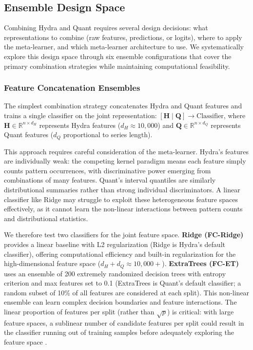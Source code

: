 \documentclass[pdflatex,sn-basic]{sn-jnl}           %
\theoremstyle{thmstyleone}%
\theoremstyle{thmstyletwo}%
\theoremstyle{thmstylethree}%
\begin{document}
\subsection{Ensemble Design Space}\label{subsec:design_space}

Combining Hydra and Quant requires several design decisions: what representations to combine (raw features, predictions, or logits), where to apply the meta-learner, and which meta-learner architecture to use. We systematically explore this design space through six ensemble configurations that cover the primary combination strategies while maintaining computational feasibility.

\subsubsection{Feature Concatenation Ensembles}

The simplest combination strategy concatenates Hydra and Quant features and trains a single classifier on the joint representation: $[\mathbf{H} \mid \mathbf{Q}] \rightarrow \text{Classifier}$, where $\mathbf{H} \in \mathbb{R}^{n \times d_H}$ represents Hydra features ($d_H \approx 10{,}000$) and $\mathbf{Q} \in \mathbb{R}^{n \times d_Q}$ represents Quant features ($d_Q$ proportional to series length).

This approach requires careful consideration of the meta-learner. Hydra's features are individually weak: the competing kernel paradigm means each feature simply counts pattern occurrences, with discriminative power emerging from combinations of many features. Quant's interval quantiles are similarly distributional summaries rather than strong individual discriminators. A linear classifier like Ridge may struggle to exploit these heterogeneous feature spaces effectively, as it cannot learn the non-linear interactions between pattern counts and distributional statistics.

We therefore test two classifiers for the joint feature space. \textbf{Ridge (FC-Ridge)} provides a linear baseline with L2 regularization (Ridge is Hydra's default classifier), offering computational efficiency and built-in regularization for the high-dimensional feature space ($d_H + d_Q \approx 10{,}000+$). \textbf{ExtraTrees (FC-ET)} uses an ensemble of 200 extremely randomized decision trees with entropy criterion and max features set to 0.1 (ExtraTrees is Quant's default classifier; a random subset of 10\% of all features are considered at each split). This non-linear ensemble can learn complex decision boundaries and feature interactions. The linear proportion of features per split (rather than $\sqrt{p}$) is critical: with large feature spaces, a sublinear number of candidate features per split could result in the classifier running out of training samples before adequately exploring the feature space \citep{quant}.
\end{document}
